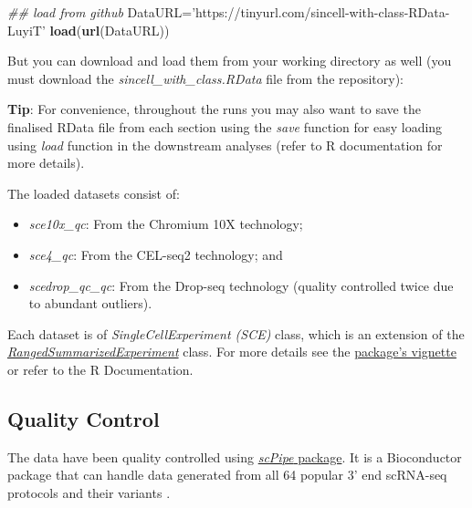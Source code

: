 \documentclass[]{book}
\newenvironment{Shaded}{\begin{snugshade}}{\end{snugshade}}
\newcommand{\CommentTok}[1]{\textcolor[rgb]{0.56,0.35,0.01}{\textit{#1}}}
\newcommand{\KeywordTok}[1]{\textcolor[rgb]{0.13,0.29,0.53}{\textbf{#1}}}
\newcommand{\NormalTok}[1]{#1}
\newcommand{\StringTok}[1]{\textcolor[rgb]{0.31,0.60,0.02}{#1}}
\providecommand{\tightlist}{%
  \setlength{\itemsep}{0pt}\setlength{\parskip}{0pt}}
\theoremstyle{definition}
\theoremstyle{definition}
\theoremstyle{definition}
\theoremstyle{remark}
\begin{document}
\begin{Shaded}
\begin{Highlighting}[]
\CommentTok{## load from github}
\NormalTok{DataURL=}\StringTok{'https://tinyurl.com/sincell-with-class-RData-LuyiT'}
\KeywordTok{load}\NormalTok{(}\KeywordTok{url}\NormalTok{(DataURL))}
\end{Highlighting}
\end{Shaded}

But you can download and load them from your working directory as well
(you must download the \emph{sincell\_with\_class.RData} file from the
repository):

\textbf{Tip}: For convenience, throughout the runs you may also want to
save the finalised RData file from each section using the \emph{save}
function for easy loading using \emph{load} function in the downstream
analyses (refer to R documentation for more details).

The loaded datasets consist of:

\begin{itemize}
\tightlist
\item
  \emph{sce10x\_qc}: From the Chromium 10X technology;
\item
  \emph{sce4\_qc}: From the CEL-seq2 technology; and
\item
  \emph{scedrop\_qc\_qc}: From the Drop-seq technology (quality
  controlled twice due to abundant outliers).
\end{itemize}

Each dataset is of \emph{SingleCellExperiment (SCE)} class, which is an
extension of the
\href{https://www.rdocumentation.org/packages/SummarizedExperiment/versions/1.2.3/topics/RangedSummarizedExperiment-class}{\emph{RangedSummarizedExperiment}}
class. For more details see the
\href{https://bioconductor.org/packages/devel/bioc/vignettes/SingleCellExperiment/inst/doc/intro.html}{package's
vignette} or refer to the R Documentation.

\hypertarget{quality-control}{%
\subsection{Quality Control}\label{quality-control}}

The data have been quality controlled using
\href{https://bioconductor.org/packages/release/bioc/html/scPipe.html}{\emph{scPipe}
package}. It is a Bioconductor package that can handle data generated
from all 64 popular 3' end scRNA-seq protocols and their variants
\citep{R-scPipe}.
\end{document}
